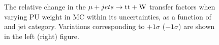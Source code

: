 \begin{figure}[!h]
  \caption{\label{fig:tfSyst_pu_muToTtw} The relative change in the $\mu + jets \rightarrow \mathrm{tt+W}$ transfer
  factors when varying PU weight in MC within its uncertainties, as a function of \scalht and jet category. 
  Variations corresponding to $+1\sigma$ ($-1\sigma$) are shown in the left (right) figure. 
  }
\end{figure}



